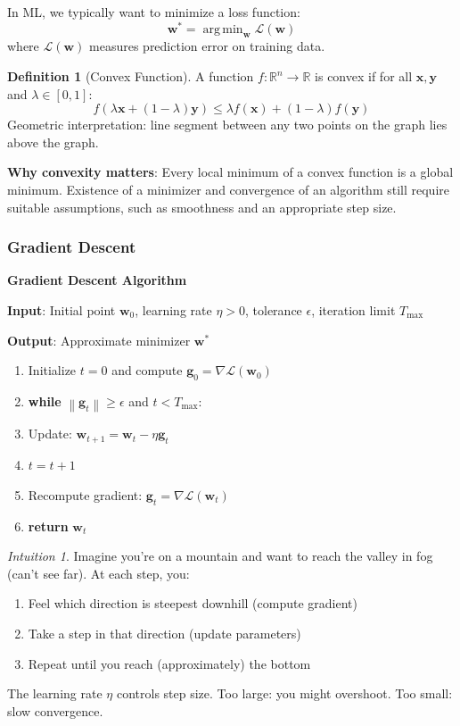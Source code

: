 \documentclass[11pt,twoside]{article}
\numberwithin{equation}{section}
\DeclareMathOperator*{\argmin}{arg\,min}
\newcommand{\R}{\mathbb{R}}
\newcommand{\vect}[1]{\bm{#1}}
\newcommand{\norm}[1]{\left\lVert#1\right\rVert}
\newcommand{\Loss}{\mathcal{L}}
\theoremstyle{plain}
\theoremstyle{definition}
\newtheorem{definition}[theorem]{Definition}
\theoremstyle{remark}
\newtheorem{intuition}[theorem]{Intuition}
\begin{document}
In ML, we typically want to minimize a loss function:
\[
\vect{w}^* = \argmin_{\vect{w}} \Loss(\vect{w})
\]
where $\Loss(\vect{w})$ measures prediction error on training data.

\begin{definition}[Convex Function]
A function $f: \R^n \to \R$ is convex if for all $\vect{x}, \vect{y}$ and $\lambda \in [0,1]$:
\[
f(\lambda \vect{x} + (1-\lambda)\vect{y}) \leq \lambda f(\vect{x}) + (1-\lambda)f(\vect{y})
\]
Geometric interpretation: line segment between any two points on the graph lies above the graph.
\end{definition}

\textbf{Why convexity matters}: Every local minimum of a convex function is a global minimum. Existence of a minimizer and convergence of an algorithm still require suitable assumptions, such as smoothness and an appropriate step size.

\subsubsection{Gradient Descent}

\begin{algorithmbox}
\textbf{Gradient Descent Algorithm}

\textbf{Input}: Initial point $\vect{w}_0$, learning rate $\eta > 0$, tolerance $\epsilon$, iteration limit $T_{\max}$

\textbf{Output}: Approximate minimizer $\vect{w}^*$

\begin{enumerate}
\item Initialize $t = 0$ and compute $\vect{g}_0 = \nabla \Loss(\vect{w}_0)$
\item \textbf{while} $\norm{\vect{g}_t}\geq\epsilon$ and $t<T_{\max}$:
\item \quad Update: $\vect{w}_{t+1} = \vect{w}_t - \eta \vect{g}_t$
\item \quad $t = t + 1$
\item \quad Recompute gradient: $\vect{g}_t = \nabla \Loss(\vect{w}_t)$
\item \textbf{return} $\vect{w}_t$
\end{enumerate}
\end{algorithmbox}

\begin{intuition}
Imagine you're on a mountain and want to reach the valley in fog (can't see far). At each step, you:
\begin{enumerate}
\item Feel which direction is steepest downhill (compute gradient)
\item Take a step in that direction (update parameters)
\item Repeat until you reach (approximately) the bottom
\end{enumerate}
The learning rate $\eta$ controls step size. Too large: you might overshoot. Too small: slow convergence.
\end{intuition}
\end{document}
